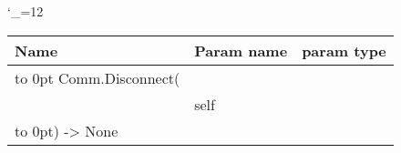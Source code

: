 \begingroup \catcode`\_=12 \tt
\begin{tabular}{lll}
\toprule
\textrm{Name}&\textrm{Param name}&\textrm{param type}\\
\midrule
\hbox to 0pt {Comm.Disconnect(\hss}\\
& self\\
\hbox to 0pt{) -> None\hss}\\
\bottomrule
\end{tabular}
\endgroup
